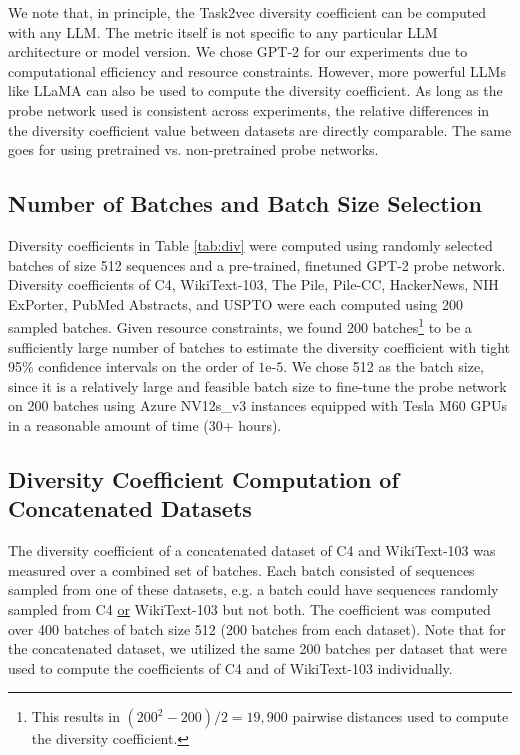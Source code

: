 We note that, in principle, the Task2vec diversity coefficient can be computed with any LLM. The metric itself is not specific to any particular LLM architecture or model version. We chose GPT-2 for our experiments due to computational efficiency and resource constraints. However, more powerful LLMs like LLaMA can also be used to compute the diversity coefficient. As long as the probe network used is consistent across experiments, the relative differences in the diversity coefficient value between datasets are directly comparable. The same goes for using pretrained vs. non-pretrained probe networks.

\subsection{Number of Batches and Batch Size Selection}
\label{appendix:parameter_selection}
Diversity coefficients in Table \ref{tab:div} were computed using randomly selected batches of size 512 sequences and a pre-trained, finetuned GPT-2 probe network. Diversity coefficients of C4, WikiText-103, The Pile, Pile-CC, HackerNews, NIH ExPorter, PubMed Abstracts, and USPTO were each computed using 200 sampled batches. Given resource constraints, we found 200 batches\footnote{This results in $(200^2-200)/2 = 19,900$ pairwise distances used to compute the diversity coefficient.} to be a sufficiently large number of batches to estimate the diversity coefficient with tight 95\% confidence intervals on the order of $1\text{e-}5$. We chose 512 as the batch size, since it is a relatively large and feasible batch size to fine-tune the probe network on 200 batches using Azure NV12s\_v3 instances equipped with Tesla M60 GPUs in a reasonable amount of time (30+ hours). 

\subsection{Diversity Coefficient Computation of Concatenated Datasets}
\label{appendix:concat_datasets}
The diversity coefficient of a concatenated dataset of C4 and WikiText-103 was measured over a combined set of batches.
Each batch consisted of sequences sampled from one of these datasets, e.g. a batch could have sequences randomly sampled from C4 \underline{or} WikiText-103 but not both.
The coefficient was computed over 400 batches of batch size 512 (200 batches from each dataset). 
Note that for the concatenated dataset, we utilized the same 200 batches per dataset that were used to compute the coefficients of C4 and of WikiText-103 individually.

